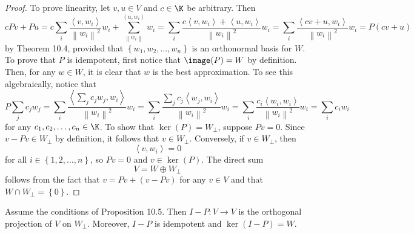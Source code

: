 \documentclass[linearalgebra]{subfiles}
\begin{document}
    \begin{proof}
        To prove linearity, let $v,u\in V$ and $c\in\K$ be arbitrary. Then
        \begin{equation*}
            cPv + Pu = c\sum^{}_{i} \frac{\left\langle v, w_i\right\rangle }{\left\lVert w_i\right\rVert ^2}w_i + \sum^{\left\langle u, w_i\right\rangle }_{\left\lVert w_i\right\rVert } w_i = \sum^{}_{i} \frac{c\left\langle v, w_i\right\rangle + \left\langle u, w_i\right\rangle }{\left\lVert w_i\right\rVert ^2}w_i = \sum^{}_{i} \frac{\left\langle cv+u, w_i\right\rangle }{\left\lVert w_i\right\rVert ^2}w_i = P\left( cv+u \right) 
        \end{equation*}
        by Theorem 10.4, provided that $\left\lbrace w_1,w_2,\ldots,w_n \right\rbrace$ is an orthonormal basis for $W$. To prove that $P$ is idempotent, first notice that $\image(P) = W$ by definition. Then, for any $w\in W$, it is clear that $w$ is the best approximation. To see this algebraically, notice that
        \begin{equation*}
            P\sum^{}_{j} c_jw_j = \sum^{}_{i} \frac{\left\langle \sum^{}_{j} c_jw_j, w_i\right\rangle }{\left\lVert w_i\right\rVert ^2}w_i = \sum^{}_{i} \frac{\sum^{}_{j} c_j\left\langle w_j, w_i\right\rangle }{\left\lVert w_i\right\rVert ^2}w_i = \sum^{}_{i} \frac{c_i\left\langle w_i, w_i\right\rangle }{\left\lVert w_i\right\rVert ^2}w_i = \sum^{}_{i} c_iw_i 
        \end{equation*}
        for any $c_1,c_2,\ldots,c_n\in\K$. To show that $\ker(P) = W_\perp$, suppose $Pv=0$. Since $v-Pv\in W_\perp$ by definition, it follows that $v\in W_\perp$. Conversely, if $v\in W_\perp$, then
        \begin{equation*}
            \left\langle v, w_i\right\rangle = 0
        \end{equation*}
        for all $i\in\left\lbrace 1,2,\ldots,n \right\rbrace$, so $Pv = 0$ and $v\in\ker(P)$. The direct sum
        \begin{equation*}
            V = W\oplus W_\perp
        \end{equation*}
        follows from the fact that $v = Pv + \left( v-Pv \right)$ for any $v\in V$ and that $W\cap W_\perp = \left\lbrace 0 \right\rbrace $.
    \end{proof}

    \begin{cor}{}
        Assume the conditions of Proposition 10.5. Then $I-P:V\to V$ is the orthogonal projection of $V$ on $W_\perp$. Moreover, $I-P$ is idempotent and $\ker(I-P) = W$.
    \end{cor}	
\end{document}
